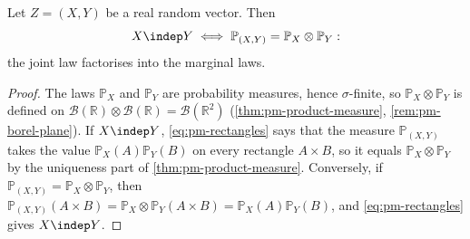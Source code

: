 \begin{theorem}\label{thm:pm-independence-product}
Let $Z=(X,Y)$ be a real random vector. Then
\[
  X\indep Y\iff\mathbb P_{(X,Y)}=\mathbb P_X\otimes\mathbb P_Y :
\]
the joint law factorises into the marginal laws.
\end{theorem}

\begin{proof}
The laws $\mathbb P_X$ and $\mathbb P_Y$ are probability measures, hence $\sigma$-finite, so
$\mathbb P_X\otimes\mathbb P_Y$ is defined on
$\mathcal B(\mathbb R)\otimes\mathcal B(\mathbb R)=\mathcal B(\mathbb R^2)$
(\cref{thm:pm-product-measure}, \cref{rem:pm-borel-plane}). If $X\indep Y$,
\eqref{eq:pm-rectangles} says that the measure $\mathbb P_{(X,Y)}$ takes the value
$\mathbb P_X(A)\mathbb P_Y(B)$ on every rectangle $A\times B$, so it equals
$\mathbb P_X\otimes\mathbb P_Y$ by the uniqueness part of \cref{thm:pm-product-measure}.
Conversely, if $\mathbb P_{(X,Y)}=\mathbb P_X\otimes\mathbb P_Y$, then
$\mathbb P_{(X,Y)}(A\times B)=\mathbb P_X\otimes\mathbb P_Y(A\times B)=\mathbb P_X(A)\mathbb P_Y(B)$,
and \eqref{eq:pm-rectangles} gives $X\indep Y$.
\end{proof}

